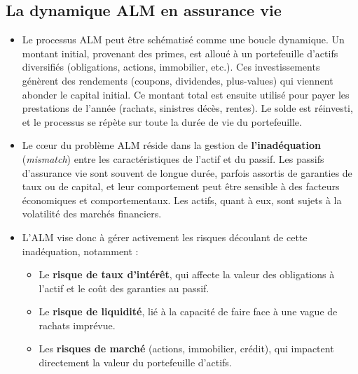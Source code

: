 \subsection{La dynamique ALM en assurance vie}
\begin{itemize}
    \item Le processus ALM peut être schématisé comme une boucle dynamique. Un montant initial, provenant des primes, est alloué à un portefeuille d'actifs diversifiés (obligations, actions, immobilier, etc.). Ces investissements génèrent des rendements (coupons, dividendes, plus-values) qui viennent abonder le capital initial. Ce montant total est ensuite utilisé pour payer les prestations de l'année (rachats, sinistres décès, rentes). Le solde est réinvesti, et le processus se répète sur toute la durée de vie du portefeuille. \newline{}
    \item Le cœur du problème ALM réside dans la gestion de \textbf{l'inadéquation} (\textit{mismatch}) entre les caractéristiques de l'actif et du passif. Les passifs d'assurance vie sont souvent de longue durée, parfois assortis de garanties de taux ou de capital, et leur comportement peut être sensible à des facteurs économiques et comportementaux. Les actifs, quant à eux, sont sujets à la volatilité des marchés financiers. \newline{}
    \item L'ALM vise donc à gérer activement les risques découlant de cette inadéquation, notamment :
    \begin{itemize}
        \item Le \textbf{risque de taux d'intérêt}, qui affecte la valeur des obligations à l'actif et le coût des garanties au passif.
        \item Le \textbf{risque de liquidité}, lié à la capacité de faire face à une vague de rachats imprévue.
        \item Les \textbf{risques de marché} (actions, immobilier, crédit), qui impactent directement la valeur du portefeuille d'actifs.
    \end{itemize}
\end{itemize}

